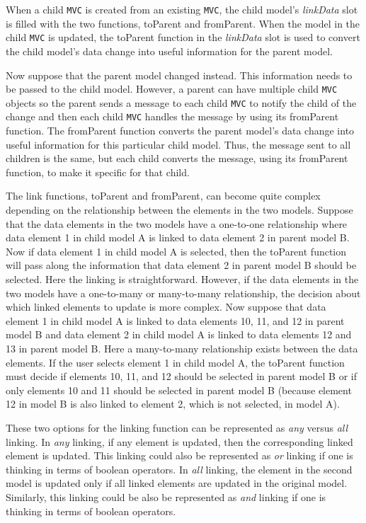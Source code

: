 \documentclass{article}[11pt]
\newcommand{\Rfunction}[1]{{\textsf{#1}}}
\newcommand{\Robject}[1]{{\texttt{#1}}}
\newcommand{\Rslot}[1]{\textsl{#1}}
\begin{document}
When a child \Robject{MVC} is created from an existing \Robject{MVC}, the
child model's \Rslot{linkData} slot is filled with the two functions,
\Rfunction{toParent} and \Rfunction{fromParent}.  When the model in
the child \Robject{MVC} is updated, the \Rfunction{toParent} function in the
\Rslot{linkData} slot is used to convert the child model's data
change into useful information for the parent model.  

Now suppose that the parent model changed instead.  This information
needs to be passed to the child model.  However, a parent can have
multiple child \Robject{MVC} objects so the parent sends a message to each
child \Robject{MVC} to notify the child of the change and then each child
\Robject{MVC} handles the message by using its \Rfunction{fromParent}
function.  The \Rfunction{fromParent} function converts the parent
model's data change into useful information for this
particular child model.  Thus, the message sent to all children is the
same, but each child converts the message, using its \Rfunction{fromParent}
function, to make it specific for that child.

The link functions, \Rfunction{toParent} and \Rfunction{fromParent}, can
become quite complex depending on the relationship between the elements in the
two models.  Suppose that the data elements in the two models have a
one-to-one relationship where data element 1 in child model A is linked to
data element 2 in parent model B.  Now if data element 1 in child model A is
selected, then the \Rfunction{toParent} function will pass along the
information that data element 2 in parent model B should be selected.  Here
the linking is straightforward.  However, if the data elements in the two
models have a one-to-many or many-to-many relationship, the decision about
which linked elements to update is more complex.  Now suppose that data
element 1 in child model A is linked to data elements 10, 11, and 12 in parent
model B and data element 2 in child model A is linked to data elements 12 and
13 in parent model B.  Here a many-to-many relationship exists between the
data elements.  If the user selects element 1 in child model A, the
\Rfunction{toParent} function must decide if elements 10, 11, and 12 should be
selected in parent model B or if only elements 10 and 11 should be selected in
parent model B (because element 12 in model B is also linked to element 2,
which is not selected, in model A).  

These two options for the linking function can be represented as \textit{any}
versus \textit{all} linking.  In \textit{any} linking, if any element is
updated, then the corresponding linked element is updated.  This linking could
also be represented as \textit{or} linking if one is thinking in terms of
boolean operators.  In \textit{all} linking, the element in the second model
is updated only if all linked elements are updated in the original model.
Similarly, this linking could be also be represented as \textit{and} linking
if one is thinking in terms of boolean operators.  
\end{document}
